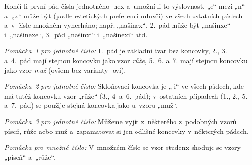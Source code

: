 Končí-li první pád čísla jednotného -nex a umožní-li to výslovnost,
„e“ mezi „n“ a „x“ může být (podle estetických preferencí mluvčí)
ve všech ostatních pádech a v čísle množném vynecháno;
např. „našinex“, 2. pád může být „našinxe“ i „našinexe“,
3. pád „našinxi“ i „našinexi“ atd.

\emph{Pomůcka 1 pro jednotné číslo:} 1. pád je základní tvar bez koncovky,
2., 3. a 4. pád mají stejnou koncovku jako vzor \emph{růže},
5., 6. a 7. mají stejnou koncovku jako vzor \emph{muž} (ovšem bez varianty
-ovi).

\emph{Pomůcka 2 pro jednotné číslo:} Skloňovací koncovka je „-i“ ve všech
pádech, kde má tutéž koncovku vzor „růže“ (3., 4. a 6. pád);
v ostatních případech (1., 2., 5. a 7. pád)
se použije stejná koncovka jako u vzoru „muž“.

\emph{Pomůcka 3 pro jednotné číslo:} Můžeme vyjít z některého z podobných
vzorů píseň, růže nebo muž a zapamatovat si jen odlišné koncovky
v některých pádech.

\emph{Pomůcka pro množné číslo:} V množném čísle se vzor studenx
shoduje se vzory „píseň“ a „růže“.
